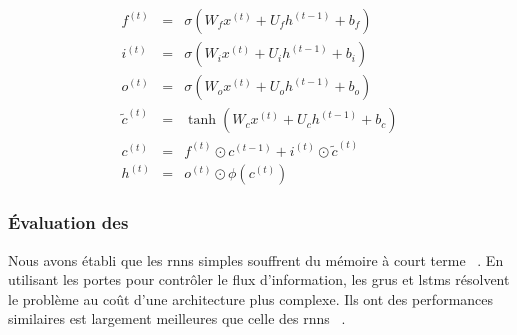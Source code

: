 \begin{eqnarray}
    \label{eq.lstm-forget}
    f^{(t)} &=&\sigma\left(W_f x^{(t)}+U_f h^{(t-1)}+b_f\right) \\
    \label{eq.lstm-input}
    i^{(t)} &=&\sigma\left(W_i x^{(t)}+U_i h^{(t-1)}+b_i\right) \\
    \label{eq.lstm-out}
    o^{(t)} &=&\sigma\left(W_o x^{(t)}+U_o h^{(t-1)}+b_o\right) \\
    \label{eq.lstm-ctilde}
    \tilde{c}^{(t)} &=&\tanh\left(W_c x^{(t)}+U_c h^{(t-1)}+b_c\right) \\
    \label{eq.lstm-c}
    c^{(t)} &=&f^{(t)} \odot c^{(t-1)}+i^{(t)} \odot \tilde{c}^{(t)} \\
    \label{eq.lstm-h}
    h^{(t)} &=&o^{(t)} \odot \phi\left(c^{(t)}\right)
\end{eqnarray}

\subsubsection{Évaluation des }

Nous avons établi que les \glspl{rnn} simples souffrent du mémoire à court terme%
~\cite{Bengio_Simard_Frasconi_1994,Pascanu_Mikolov_Bengio}.
En utilisant les portes pour contrôler le flux d'information,
les \glspl{gru} et \glspl{lstm} résolvent le problème au coût d'une architecture plus complexe.
Ils ont des performances similaires est largement meilleures que celle des \glspl{rnn}%
~\cite{Chung_Gulcehre_Cho_Bengio_2014}.
